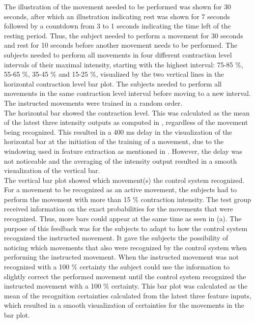 The illustration of the movement needed to be performed was shown for 30 seconds, after which an illustration indicating rest was shown for 7 seconds followed by a countdown from 3 to 1 seconds indicating the time left of the resting period. Thus, the subject needed to perform a movement for 30 seconds and rest for 10 seconds before another movement needs to be performed. The subjects needed to perform all movements in four different contraction level intervals of their maximal intensity, starting with the highest interval: 75-85 \%, 55-65 \%, 35-45 \% and 15-25 \%, visualized by the two vertical lines in the horizontal contraction level bar plot. The subjects needed to perform all movements in the same contraction level interval before moving to a new interval. The instructed movements were trained in a random order. \\
The horizontal bar showed the contraction level. This was calculated as the mean of the latest three intensity outputs as computed in , regardless of the movement being recognized. This resulted in a 400 ms delay in the visualization of the horizontal bar at the initiation of the training of a movement, due to the windowing used in feature extraction as mentioned in . However, the delay was not noticeable and the averaging of the intensity output resulted in a smooth visualization of the vertical bar. \\
The vertical bar plot showed which movement(s) the control system recognized. For a movement to be recognized as an active movement, the subjects had to perform the movement with more than 15 \% contraction intensity. The test group received information on the exact probabilities for the movements that were recognized. Thus, more bars could appear at the same time as seen in  (a). The purpose of this feedback was for the subjects to adapt to how the control system recognized the instructed movement. It gave the subjects the possibility of noticing which movements that also were recognized by the control system when performing the instructed movement. When the instructed movement was not recognized with a 100 \% certainty the subject could use the information to slightly correct the performed movement until the control system recognized the instructed movement with a 100 \% certainty. This bar plot was calculated as the mean of the recognition certainties calculated from the latest three feature inputs, which resulted in a smooth visualization of certainties for the movements in the bar plot. \\
